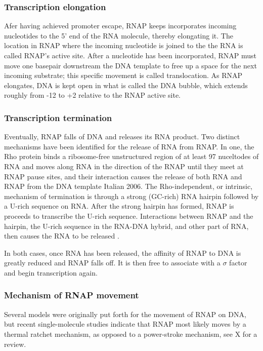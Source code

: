 \subsubsection{Transcription elongation}
Afer having achieved promoter escape, RNAP keeps incorporates incoming
nucleotides to the 5' end of the RNA molecule, thereby elongating it. The
location in RNAP where the incoming nucleotide is joined to the the RNA is
called RNAP's active site. After a nucleotide has been incorporated, RNAP must
move one basepair downstream the DNA template to free up a space for the next
incoming substrate; this specific movement is called translocation. As RNAP
elongates, DNA is kept open in what is called the DNA bubble, which extends
roughly from -12 to +2 relative to the RNAP active site.

\subsubsection{Transcription termination}
Eventually, RNAP falls of DNA and releases its RNA product. Two distinct
mechanisms have been identified for the release of RNA from RNAP. In one, the Rho
protein binds a ribosome-free unstructured region of at least 97 nuceltodes of
RNA and moves along RNA in the direction of the RNAP until they meet at RNAP
pause sites, and their interaction causes the release of both RNA and RNAP from
the DNA template \cite{ciampi_rho-dependent_2006} Italian 2006. The
Rho-independent, or intrinsic, mechanism of termination is through a strong
(GC-rich) RNA hairpin followed by a U-rich sequence on RNA. After the strong
hairpin has formed, RNAP is proceeds to transcribe the U-rich sequence.
Interactions between RNAP and the hairpin, the U-rich sequence in the RNA-DNA
hybrid, and other part of RNA, then causes the RNA to be released
\cite{nudler_transcription_2002}.

In both cases, once RNA has been released, the affinity of RNAP to DNA is
greatly reduced and RNAP falls off. It is then free to associate with a
$\sigma$ factor and begin transcription again.

\subsubsection{Mechanism of RNAP movement}
Several models were originally put forth for the movement of RNAP on DNA, but
recent single-molecule studies indicate that RNAP most likely moves by a
thermal ratchet mechanism, as opposed to a power-stroke mechanism, see X for a
review.

